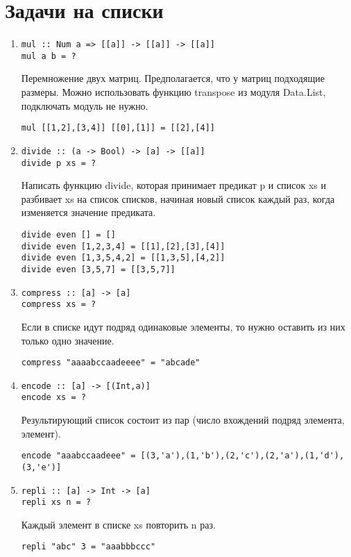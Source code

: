 \documentclass[a4paper,10pt]{article}
\begin{document}
\section{Задачи на списки}
\begin{enumerate}

\item {
\begin{lstlisting}
mul :: Num a => [[a]] -> [[a]] -> [[a]] 
mul a b = ?
\end{lstlisting}
Перемножение двух матриц. Предполагается, что у матриц подходящие размеры. Можно использовать
функцию transpose из модуля Data.List, подключать модуль не нужно.
\begin{lstlisting}
mul [[1,2],[3,4]] [[0],[1]] = [[2],[4]]
\end{lstlisting}
}

\item {
\begin{lstlisting}
divide :: (a -> Bool) -> [a] -> [[a]]
divide p xs = ?
\end{lstlisting}
Написать функцию divide, которая принимает предикат p и список xs и разбивает xs на список
списков, начиная новый список каждый раз, когда изменяется значение предиката.
\begin{lstlisting}
divide even [] = []
divide even [1,2,3,4] = [[1],[2],[3],[4]]
divide even [1,3,5,4,2] = [[1,3,5],[4,2]]
divide even [3,5,7] = [[3,5,7]]
\end{lstlisting}
}

\item {
\begin{lstlisting}
compress :: [a] -> [a]
compress xs = ?
\end{lstlisting}
Если в списке идут подряд одинаковые элементы, то нужно оставить из них только одно значение.
\begin{lstlisting}
compress "aaaabccaadeeee" = "abcade"
\end{lstlisting}
}

\item {
\begin{lstlisting}
encode :: [a] -> [(Int,a)]
encode xs = ?
\end{lstlisting}
Результирующий список состоит из пар (число вхождений подряд элемента, элемент).
\begin{lstlisting}
encode "aaabccaadeee" = [(3,'a'),(1,'b'),(2,'c'),(2,'a'),(1,'d'),(3,'e')]
\end{lstlisting}
}

\item {
\begin{lstlisting}
repli :: [a] -> Int -> [a]
repli xs n = ?
\end{lstlisting}
Каждый элемент в списке xs повторить n раз.
\begin{lstlisting}
repli "abc" 3 = "aaabbbccc"
\end{lstlisting}
}


\end{enumerate}
\end{document}
